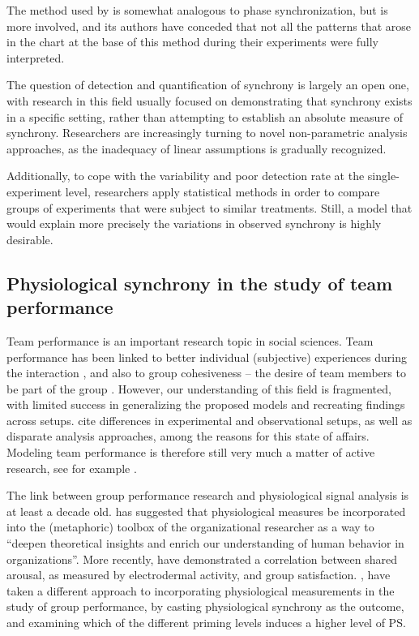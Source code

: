 \documentclass[a4paper, 11pt]{report}      %
\begin{document}
The method used by \cite{wallot2016multidimensional} is somewhat analogous to phase synchronization, but is more involved, and its authors have conceded that not all the patterns that arose in the chart at the base of this method during their experiments were fully interpreted.

The question of detection and quantification of synchrony is largely an open one, with research in this field usually focused on demonstrating that synchrony exists in a specific setting, rather than attempting to establish an absolute measure of synchrony. Researchers are increasingly turning to novel non-parametric analysis approaches, as the inadequacy of linear assumptions is gradually recognized. 

Additionally, to cope with the variability and poor detection rate at the single-experiment level, researchers apply statistical methods in order to compare groups of experiments that were subject to similar treatments. Still, a model that would explain more precisely the variations in observed synchrony is highly desirable.   

\subsection{Physiological synchrony in the study of team performance}
Team performance is an important research topic in social sciences. Team performance has been linked to better individual (subjective) experiences during the interaction \citep{lodahl1961psychometric}, and also to group cohesiveness -- the desire of team members to be part of the group \citep{cartwright1968nature}. However, our understanding of this field is fragmented, with limited success in generalizing the proposed models and recreating findings across setups. \citet{beal2003cohesion} cite differences in experimental and observational setups, as well as disparate analysis approaches, among the reasons for this state of affairs. Modeling team performance is therefore still very much a matter of active research, see for example \citet{collins2019explorations}.

The link between group performance research and physiological signal analysis is at least a decade old. \cite{akinola2010measuring} has suggested that physiological measures be incorporated into the (metaphoric) toolbox of the organizational researcher as a way to \enquote{deepen theoretical insights and enrich our understanding of human behavior in organizations}. More recently, \cite{chikersal2017deep} have demonstrated a correlation between shared arousal, as measured by electrodermal activity, and group satisfaction. \cite{danyluck2018intergroup}, have taken a different approach to incorporating physiological measurements in the study of group performance, by casting physiological synchrony as the outcome, and examining which of the different priming levels induces a higher level of PS. 
\end{document}
